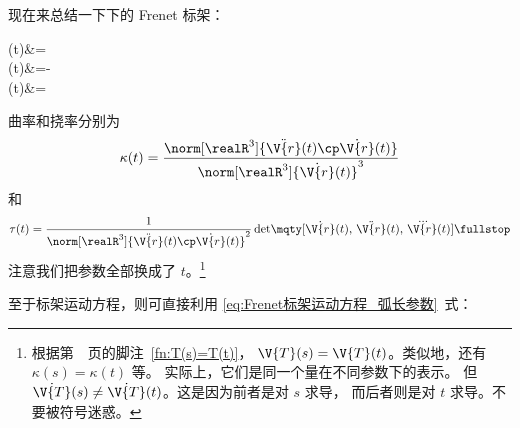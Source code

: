 现在来总结一下下的 Frenet 标架：
\begin{braceEq*}{\label{eq:Frenet标架_一般参数}}
	(t)&=
		\comma \\
	(t)&=-
		{
			} \comma \\
	(t)&=
		{} \fullstop
\end{braceEq*}
曲率和挠率分别为
\begin{equation}
	\kappa(t)=\frac{\norm[\realR^3]{\ddot{\V{r}}(t)\cp\dot{\V{r}}(t)}}
		{\norm[\realR^3]{\dot{\V{r}}(t)}^3}
\end{equation}
和
\begin{equation}
	\tau(t)=
	\frac{1}{\norm[\realR^3]{\ddot{\V{r}}(t)\cp\dot{\V{r}}(t)}^2}
	\det\!\mqty[\dot{\V{r}}(t),\,\ddot{\V{r}}(t),\,\dddot{\V{r}}(t)]
	\fullstop
\end{equation}
注意我们把参数全部换成了 $t$。\footnote{
	根据第~\pageref{fn:T(s)=T(t)}~页的脚注~\ref{fn:T(s)=T(t)}，
	$\V{T}(s)=\V{T}(t)$。类似地，还有 $\kappa(s)=\kappa(t)$ 等。
实际上，它们是同一个量在不同参数下的表示。
但 $\dot{\V{T}}(s)\neq\dot{\V{T}}(t)$。这是因为前者是对 $s$ 求导，
而后者则是对 $t$ 求导。不要被符号迷惑。}

至于标架运动方程，则可直接利用
\eqref{eq:Frenet标架运动方程_弧长参数}~式：

